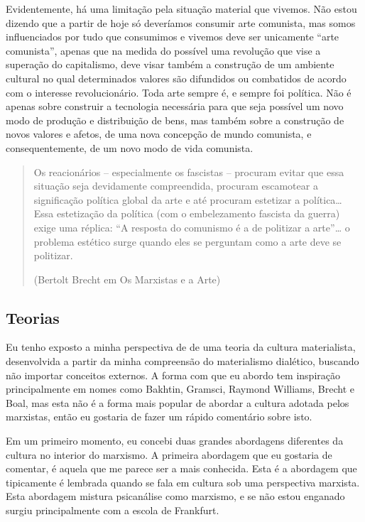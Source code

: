 Evidentemente, há uma limitação pela situação material que vivemos. Não estou dizendo que a partir de hoje só deveríamos consumir arte comunista, mas somos influenciados por tudo que consumimos e vivemos deve ser unicamente “arte comunista”, apenas que na medida do possível uma revolução que vise a superação do capitalismo, deve visar também a construção de um ambiente cultural no qual determinados valores são difundidos ou combatidos de acordo com o interesse revolucionário. Toda arte sempre é, e sempre foi política. Não é apenas sobre construir a tecnologia necessária para que seja possível um novo modo de produção e distribuição de bens, mas também sobre a construção de novos valores e afetos, de uma nova concepção de mundo comunista, e consequentemente, de um novo modo de vida comunista.

\begin{quote}
Os reacionários – especialmente os fascistas – procuram evitar que essa situação seja devidamente compreendida, procuram escamotear a significação política global da arte e até procuram estetizar a política… Essa estetização da política (com o embelezamento fascista da guerra) exige uma réplica: “A resposta do comunismo é a de politizar a arte”… o problema estético surge quando eles se perguntam como a arte deve se politizar.

(Bertolt Brecht em Os Marxistas e a Arte)
\end{quote}

\subsection{Teorias}

Eu tenho exposto a minha perspectiva de de uma teoria da cultura materialista, desenvolvida a partir da minha compreensão do materialismo dialético, buscando não importar conceitos externos. A forma com que eu abordo tem inspiração principalmente em nomes como Bakhtin, Gramsci, Raymond Williams, Brecht e Boal, mas esta não é a forma mais popular de abordar a cultura adotada pelos marxistas, então eu gostaria de fazer um rápido comentário sobre isto. 

Em um primeiro momento, eu concebi duas grandes abordagens diferentes da cultura no interior do marxismo. A primeira abordagem que eu gostaria de comentar, é aquela que me parece ser a mais conhecida. Esta é a abordagem que tipicamente é lembrada quando se fala em cultura sob uma perspectiva marxista. Esta abordagem mistura psicanálise como marxismo, e se não estou enganado surgiu principalmente com a escola de Frankfurt.

